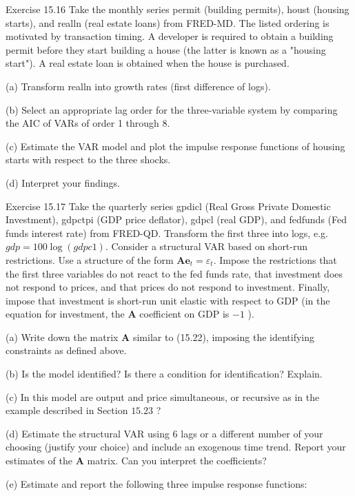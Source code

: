 \documentclass[10pt]{article}
\begin{document}
Exercise 15.16 Take the monthly series permit (building permits), houst (housing starts), and realln (real estate loans) from FRED-MD. The listed ordering is motivated by transaction timing. A developer is required to obtain a building permit before they start building a house (the latter is known as a "housing start"). A real estate loan is obtained when the house is purchased.

(a) Transform realln into growth rates (first difference of logs).

(b) Select an appropriate lag order for the three-variable system by comparing the AIC of VARs of order 1 through 8.

(c) Estimate the VAR model and plot the impulse response functions of housing starts with respect to the three shocks.

(d) Interpret your findings.

Exercise 15.17 Take the quarterly series gpdicl (Real Gross Private Domestic Investment), gdpctpi (GDP price deflator), gdpcl (real GDP), and fedfunds (Fed funds interest rate) from FRED-QD. Transform the first three into logs, e.g. $g d p=100 \log (g d p c 1)$. Consider a structural VAR based on short-run restrictions. Use a structure of the form $\boldsymbol{A} \boldsymbol{e}_{t}=\varepsilon_{t}$. Impose the restrictions that the first three variables do not react to the fed funds rate, that investment does not respond to prices, and that prices do not respond to investment. Finally, impose that investment is short-run unit elastic with respect to GDP (in the equation for investment, the $\boldsymbol{A}$ coefficient on GDP is $-1$ ).

(a) Write down the matrix $\boldsymbol{A}$ similar to (15.22), imposing the identifying constraints as defined above.

(b) Is the model identified? Is there a condition for identification? Explain.

(c) In this model are output and price simultaneous, or recursive as in the example described in Section $15.23$ ?

(d) Estimate the structural VAR using 6 lags or a different number of your choosing (justify your choice) and include an exogenous time trend. Report your estimates of the $\boldsymbol{A}$ matrix. Can you interpret the coefficients?

(e) Estimate and report the following three impulse response functions:
\end{document}
